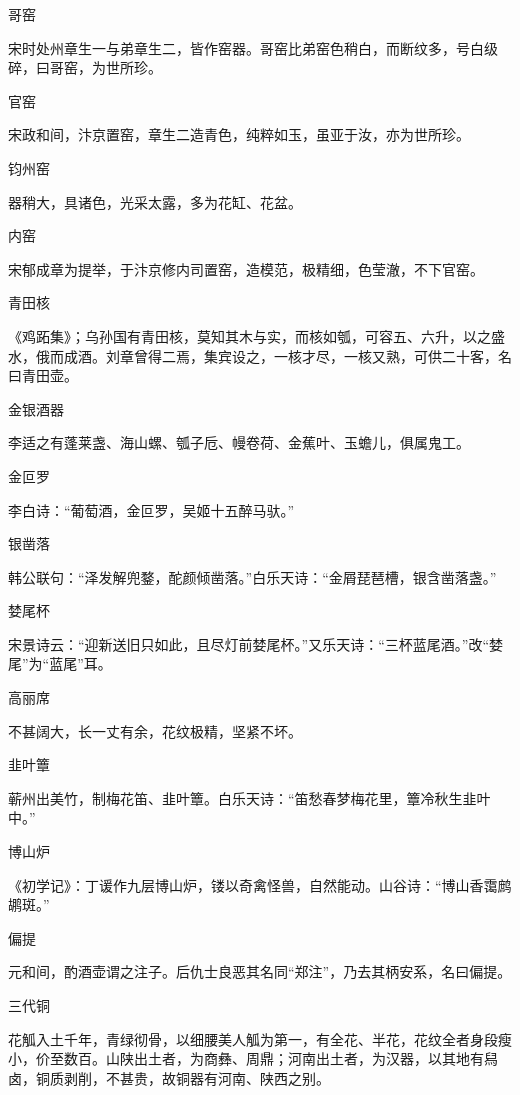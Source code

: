 \documentclass[a4paper,12pt,UTF8,twoside]{ctexbook}
\begin{document}
    哥窑
    
    宋时处州章生一与弟章生二，皆作窑器。哥窑比弟窑色稍白，而断纹多，号白级碎，曰哥窑，为世所珍。
    
    官窑
    
    宋政和间，汴京置窑，章生二造青色，纯粹如玉，虽亚于汝，亦为世所珍。
    
    钧州窑
    
    器稍大，具诸色，光采太露，多为花缸、花盆。
    
    内窑
    
    宋郁成章为提举，于汴京修内司置窑，造模范，极精细，色莹澈，不下官窑。
    
    青田核
    
    《鸡跖集》；乌孙国有青田核，莫知其木与实，而核如瓠，可容五、六升，以之盛水，俄而成酒。刘章曾得二焉，集宾设之，一核才尽，一核又熟，可供二十客，名曰青田壶。
    
    金银酒器
    
    李适之有蓬莱盏、海山螺、瓠子卮、幔卷荷、金蕉叶、玉蟾儿，俱属鬼工。
    
    金叵罗
    
    李白诗：“葡萄酒，金叵罗，吴姬十五醉马驮。”
    
    银凿落
    
    韩公联句：“泽发解兜鍪，酡颜倾凿落。”白乐天诗：“金屑琵琶槽，银含凿落盏。”
    
    婪尾杯
    
    宋景诗云：“迎新送旧只如此，且尽灯前婪尾杯。”又乐天诗：“三杯蓝尾酒。”改“婪尾”为“蓝尾”耳。
    
    高丽席
    
    不甚阔大，长一丈有余，花纹极精，坚紧不坏。
    
    韭叶簟
    
    蕲州出美竹，制梅花笛、韭叶簟。白乐天诗：“笛愁春梦梅花里，簟冷秋生韭叶中。”
    
    博山炉
    
    《初学记》：丁谖作九层博山炉，镂以奇禽怪兽，自然能动。山谷诗：“博山香霭鹧鹕斑。”
    
    偏提
    
    元和间，酌酒壶谓之注子。后仇士良恶其名同“郑注”，乃去其柄安系，名曰偏提。
    
    三代铜
    
    花觚入土千年，青绿彻骨，以细腰美人觚为第一，有全花、半花，花纹全者身段瘦小，价至数百。山陕出土者，为商彝、周鼎；河南出土者，为汉器，以其地有舄卤，铜质剥削，不甚贵，故铜器有河南、陕西之别。
    
\end{document}

